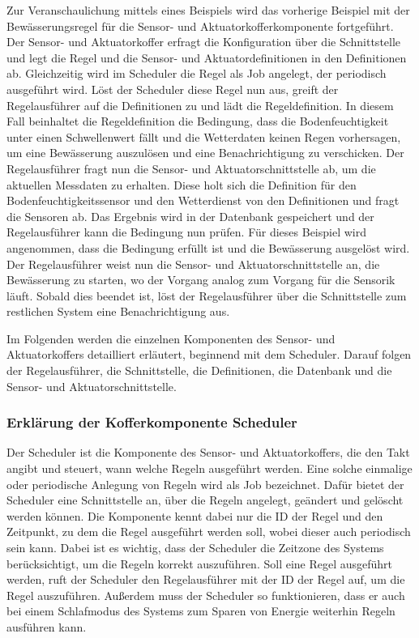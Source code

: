 Zur Veranschaulichung mittels eines Beispiels wird das vorherige Beispiel mit der Bewässerungsregel für die Sensor- und Aktuatorkofferkomponente fortgeführt.
Der Sensor- und Aktuatorkoffer erfragt die Konfiguration über die Schnittstelle und legt die Regel und die Sensor- und Aktuatordefinitionen in den Definitionen ab.
Gleichzeitig wird im Scheduler die Regel als Job angelegt, der periodisch ausgeführt wird.
Löst der Scheduler diese Regel nun aus, greift der Regelausführer auf die Definitionen zu und lädt die Regeldefinition.
In diesem Fall beinhaltet die Regeldefinition die Bedingung, dass die Bodenfeuchtigkeit unter einen Schwellenwert fällt und die Wetterdaten keinen Regen vorhersagen, um eine Bewässerung auszulösen und eine Benachrichtigung zu verschicken.
Der Regelausführer fragt nun die Sensor- und Aktuatorschnittstelle ab, um die aktuellen Messdaten zu erhalten.
Diese holt sich die Definition für den Bodenfeuchtigkeitssensor und den Wetterdienst von den Definitionen und fragt die Sensoren ab.
Das Ergebnis wird in der Datenbank gespeichert und der Regelausführer kann die Bedingung nun prüfen.
Für dieses Beispiel wird angenommen, dass die Bedingung erfüllt ist und die Bewässerung ausgelöst wird.
Der Regelausführer weist nun die Sensor- und Aktuatorschnittstelle an, die Bewässerung zu starten, wo der Vorgang analog zum Vorgang für die Sensorik läuft.
Sobald dies beendet ist, löst der Regelausführer über die Schnittstelle zum restlichen System eine Benachrichtigung aus.

Im Folgenden werden die einzelnen Komponenten des Sensor- und Aktuatorkoffers detailliert erläutert, beginnend mit dem Scheduler.
Darauf folgen der Regelausführer, die Schnittstelle, die Definitionen, die Datenbank und die Sensor- und Aktuatorschnittstelle.

\subsubsection{Erklärung der Kofferkomponente Scheduler}
Der Scheduler ist die Komponente des Sensor- und Aktuatorkoffers, die den Takt angibt und steuert, wann welche Regeln ausgeführt werden.
Eine solche einmalige oder periodische Anlegung von Regeln wird als Job bezeichnet.
Dafür bietet der Scheduler eine Schnittstelle an, über die Regeln angelegt, geändert und gelöscht werden können.
Die Komponente kennt dabei nur die ID der Regel und den Zeitpunkt, zu dem die Regel ausgeführt werden soll, wobei dieser auch periodisch sein kann.
Dabei ist es wichtig, dass der Scheduler die Zeitzone des Systems berücksichtigt, um die Regeln korrekt auszuführen.
Soll eine Regel ausgeführt werden, ruft der Scheduler den Regelausführer mit der ID der Regel auf, um die Regel auszuführen.
Außerdem muss der Scheduler so funktionieren, dass er auch bei einem Schlafmodus des Systems zum Sparen von Energie weiterhin Regeln ausführen kann.

